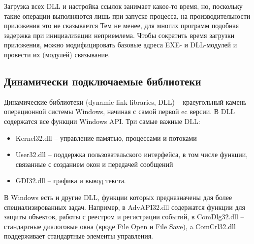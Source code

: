 Загрузка всех DLL и настройка ссылок занимает какое-то время, но, поскольку такие операции выполняются лишь при запуске процесса, на производительности приложения это не сказывается Тем не менее, для многих программ подобная задержка при инициализации неприемлема. Чтобы сократить время загрузки приложения, можно модифицировать базовые адреса EXE- и DLL-модулей и провести их (модулей) связывание.

\subsection{Динамически подключаемые библиотеки}

Динамические библиотеки (dynamic-link libraries, DLL) -- краеугольный камень операционной системы Windows, начиная с самой первой ec версии. В DLL содержатся все функции Windows API. Три самые важные DLL:
\begin{itemize}
\item Kernel32.dll -- управление памятью, процессами и потоками
\item User32.dll -- поддержка пользовательского интерфейса, в том числе функции, связанные с созданием окон и передачей сообщений
\item GDI32.dll -- графика и вывод текста.
\end{itemize}

В Windows есть и другие DLL, функции которых предназначены для более специализированных задач. Например, в AdvAPI32.dll содержатся функции для защиты объектов, работы с реестром и регистрации событий, в ComDlg32.dll -- стандартные диалоговые окна (вроде File Open и File Save), a ComCrl32.dll поддерживает стандартные элементы управления.

